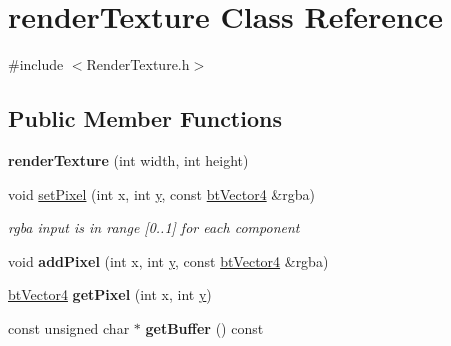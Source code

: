 \hypertarget{classrender_texture}{\section{render\+Texture Class Reference}
\label{classrender_texture}
}


{\ttfamily \#include $<$Render\+Texture.\+h$>$}

\subsection*{Public Member Functions}
\begin{DoxyCompactItemize}
\item 
\hypertarget{classrender_texture_a8a74e45be96abfbe5ebe6c41760dd566}{{\bfseries render\+Texture} (int width, int height)}\label{classrender_texture_a8a74e45be96abfbe5ebe6c41760dd566}

\item 
\hypertarget{classrender_texture_aa972c3dc053eb61e68f8edfaca11eccf}{void \hyperlink{classrender_texture_aa972c3dc053eb61e68f8edfaca11eccf}{set\+Pixel} (int x, int \hyperlink{_ice_utils_8h_aa7ffaed69623192258fb8679569ff9ba}{y}, const \hyperlink{classbt_vector4}{bt\+Vector4} \&rgba)}\label{classrender_texture_aa972c3dc053eb61e68f8edfaca11eccf}

\begin{DoxyCompactList}\small\item\em rgba input is in range \mbox{[}0..1\mbox{]} for each component \end{DoxyCompactList}\item 
\hypertarget{classrender_texture_aa12736ac55cd43d4ca42b363e7f10953}{void {\bfseries add\+Pixel} (int x, int \hyperlink{_ice_utils_8h_aa7ffaed69623192258fb8679569ff9ba}{y}, const \hyperlink{classbt_vector4}{bt\+Vector4} \&rgba)}\label{classrender_texture_aa12736ac55cd43d4ca42b363e7f10953}

\item 
\hypertarget{classrender_texture_acc35215d6f22efbc15a9a2e35f1e4bab}{\hyperlink{classbt_vector4}{bt\+Vector4} {\bfseries get\+Pixel} (int x, int \hyperlink{_ice_utils_8h_aa7ffaed69623192258fb8679569ff9ba}{y})}\label{classrender_texture_acc35215d6f22efbc15a9a2e35f1e4bab}

\item 
\hypertarget{classrender_texture_a10679394a58a58433499622a5c224484}{const unsigned char $\ast$ {\bfseries get\+Buffer} () const }\label{classrender_texture_a10679394a58a58433499622a5c224484}


\end{DoxyCompactItemize}
